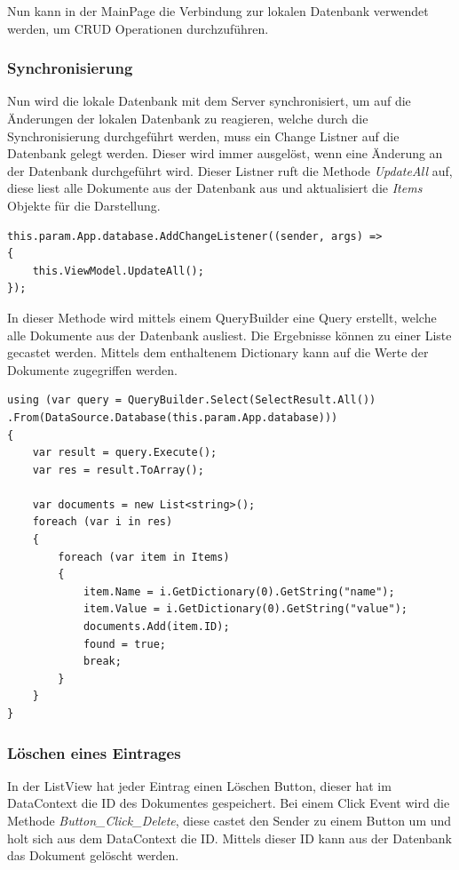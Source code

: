 Nun kann in der MainPage die Verbindung zur lokalen Datenbank verwendet werden, um CRUD Operationen durchzuführen.

\subsubsection{Synchronisierung}

Nun wird die lokale Datenbank mit dem Server synchronisiert, um auf die Änderungen der lokalen Datenbank zu reagieren, welche durch die Synchronisierung durchgeführt werden, muss ein Change Listner auf die Datenbank gelegt werden. Dieser wird immer ausgelöst, wenn eine Änderung an der Datenbank durchgeführt wird. Dieser Listner ruft die Methode \textit{UpdateAll} auf, diese liest alle Dokumente aus der Datenbank aus und aktualisiert die \textit{Items} Objekte für die Darstellung.

\begin{verbatim}
this.param.App.database.AddChangeListener((sender, args) =>
{
	this.ViewModel.UpdateAll();
});
\end{verbatim}

In dieser Methode wird mittels einem QueryBuilder eine Query erstellt, welche alle Dokumente aus der Datenbank ausliest. Die Ergebnisse können zu einer Liste gecastet werden. Mittels dem enthaltenem Dictionary kann auf die Werte der Dokumente zugegriffen werden. \cite{couchbasegettingstarted}

\begin{verbatim}
using (var query = QueryBuilder.Select(SelectResult.All())
.From(DataSource.Database(this.param.App.database)))
{
	var result = query.Execute();
	var res = result.ToArray();
	
	var documents = new List<string>();
	foreach (var i in res)
	{
		foreach (var item in Items)
		{
			item.Name = i.GetDictionary(0).GetString("name");
			item.Value = i.GetDictionary(0).GetString("value");
			documents.Add(item.ID);
			found = true;
			break;
		}
	}
}
\end{verbatim}

\subsubsection{Löschen eines Eintrages}

In der ListView hat jeder Eintrag einen Löschen Button, dieser hat im DataContext die ID des Dokumentes gespeichert. Bei einem Click Event wird die Methode \textit{Button\_Click\_Delete}, diese castet den Sender zu einem Button um und holt sich aus dem DataContext die ID. Mittels dieser ID kann aus der Datenbank das Dokument gelöscht werden. \cite{uwpbutton}

